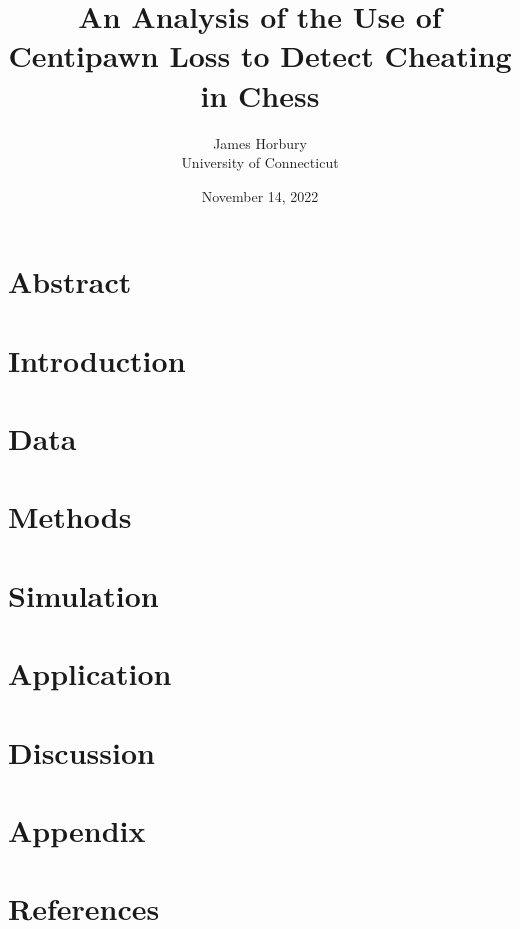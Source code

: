 \documentclass[12pt]{article}
\title{An Analysis of the Use of Centipawn Loss to Detect Cheating in Chess}
\author{James Horbury\\
    University of Connecticut
}
\date{November 14, 2022}
\begin{document}
\maketitle

\section*{Abstract}
\label{sec:abs}

\section*{Introduction}
\label{sec:intro}

\section*{Data}
\label{sec:data}

\section*{Methods}
\label{sec:meth}

\section*{Simulation}
\label{sec:sim}

\section*{Application}
\label{sec:app}

\section*{Discussion}
\label{sec:disc}

\section*{Appendix}
\label{sec:appx}

\section*{References}
\label{sec:refs}
\end{document}
